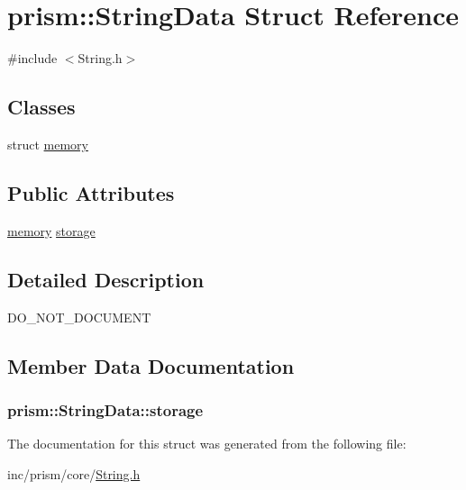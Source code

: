 \hypertarget{structprism_1_1_string_data}{}\section{prism\+:\+:String\+Data Struct Reference}
\label{structprism_1_1_string_data}


{\ttfamily \#include $<$String.\+h$>$}

\subsection*{Classes}
\begin{DoxyCompactItemize}
\item 
struct \hyperlink{structprism_1_1_string_data_1_1memory}{memory}
\end{DoxyCompactItemize}
\subsection*{Public Attributes}
\begin{DoxyCompactItemize}
\item 
\hyperlink{structprism_1_1_string_data_1_1memory}{memory} \hyperlink{structprism_1_1_string_data_afe8efdbe7e9f6a6913dc51bd9177dc0e}{storage}
\end{DoxyCompactItemize}


\subsection{Detailed Description}
D\+O\+\_\+\+N\+O\+T\+\_\+\+D\+O\+C\+U\+M\+E\+NT 

\subsection{Member Data Documentation}
\subsubsection[{\texorpdfstring{storage}{storage}}]{ prism\+::\+String\+Data\+::storage}\hypertarget{structprism_1_1_string_data_afe8efdbe7e9f6a6913dc51bd9177dc0e}{}\label{structprism_1_1_string_data_afe8efdbe7e9f6a6913dc51bd9177dc0e}


The documentation for this struct was generated from the following file\+:\begin{DoxyCompactItemize}
\item 
inc/prism/core/\hyperlink{_string_8h}{String.\+h}\end{DoxyCompactItemize}
